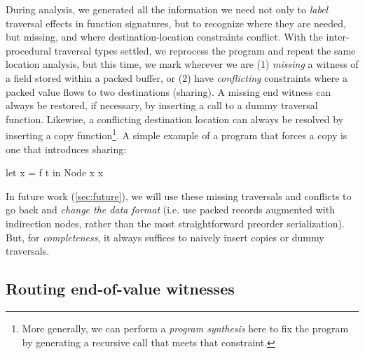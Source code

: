 \documentclass[a4paper,english]{lipics-v2016}
\begin{document}
{During analysis, we generated all the information we need not only to {\em
    label} traversal effects in function signatures, but to recognize where they
  are needed, but missing, and where destination-location constraints conflict.}
%
  With the inter-procedural traversal types settled,
  we reprocess the program and repeat the same location analysis, but this time,
  we mark wherever we are (1) {\em missing} a witness of a field stored within a
  packed buffer, or (2) have {\em conflicting} constraints where a packed value
  flows to two destinations (sharing).
%
  A missing end witness can always be restored, if necessary, by inserting a
  call to a dummy traversal function.  Likewise, a conflicting destination
  location can always be resolved by inserting a copy function\footnote{More
    generally, we can perform a {\em program synthesis} here to fix the program
    by generating a recursive call that meets that constraint.
  }.
%
A simple example of a program that forces a copy is one that introduces sharing:
%
\begin{code}
let x = f t in  Node x x 
\end{code}

In future work (\cref{sec:future}), we will use these missing traversals and
conflicts to go back and {\em change the data format} (i.e. use packed records
{augmented} with indirection nodes, rather than the most straightforward
preorder serialization).
%
But, for {\em completeness}, it always suffices to naively insert copies or dummy
traversals.


\subsection{Routing end-of-value witnesses}
\end{document}

